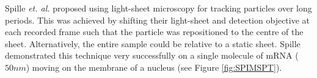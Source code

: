 Spille \emph{et. al.} proposed using light-sheet microscopy for tracking particles over long periods.
This was achieved by shifting their light-sheet and detection objective at each recorded frame such that the particle was repositioned to the centre of the sheet.
Alternatively, the entire sample could be relative to a static sheet.
Spille demonstrated this technique very successfully on a single molecule of mRNA (\(50 nm\)\cite{Spille2015a}) moving on the membrane of a nucleus\cite{Spille2015a} (see Figure \ref{fig:SPIMSPT}).
%
%
%
%



